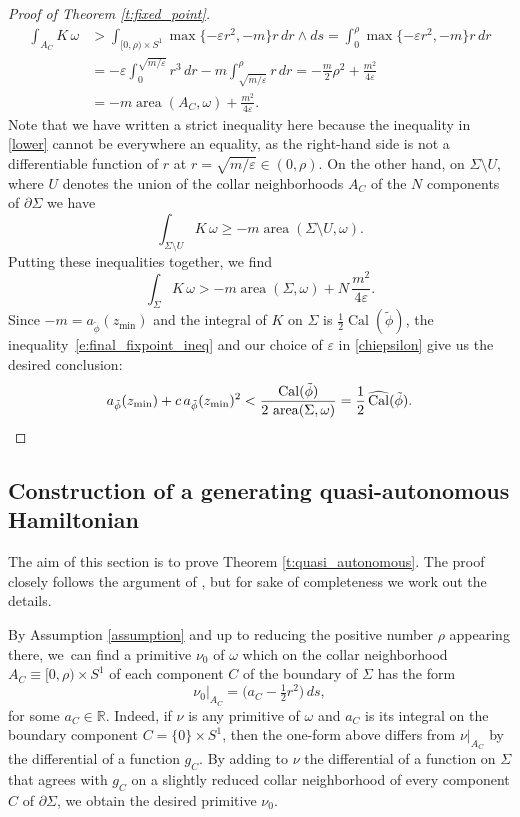 \documentclass[11pt]{article}
\newcommand{\Subsection}{\subsection}
\numberwithin{equation}{section}
\let\mathds\mathbb
\let\epsilon\varepsilon
\theoremstyle{definition}
\DeclareMathOperator{\area}{area}
\DeclareMathOperator{\Cal}{Cal}
\newcommand{\R}{\mathds{R}}
\begin{document}
\begin{proof}[Proof of Theorem \ref{t:fixed_point}]
\[
\begin{split}
\int_{A_C} K\, \omega
&>
\int_{[0,\rho) \times S^1} \max\{ -\epsilon r^2 , -m\} r\, dr\wedge ds
= \int_0^{\rho} \max\{ -\epsilon r^2 , -m\} r\, dr \\
&= - \epsilon \int_0^{\sqrt{m/\epsilon}}r^3\, dr - m \int_{\sqrt{m/\epsilon}}^{\rho} r\, dr = -\frac{m}{2} \rho^2 + \frac{m^2}{4\epsilon}\\
&
=
-m\area(A_C,\omega) + \frac{m^2}{4\epsilon}.
\end{split}
\]
Note that we have written a strict inequality here because the inequality in \eqref{lower} cannot be everywhere an equality, as the right-hand side is not a differentiable function of $r$ at $r=\sqrt{m/\epsilon} \in (0,\rho)$. On the other hand, on $\Sigma\setminus U$, where $U$ denotes the union of the collar neighborhoods $A_C$ of the $N$ components of $\partial \Sigma$ we have
\[
\int_{\Sigma\setminus U} K\, \omega \geq -m \area(\Sigma\setminus U,\omega).
\]
Putting these inequalities together, we find
\begin{equation}
\label{e:final_fixpoint_ineq}
\int_{\Sigma} K\, \omega > -m\area(\Sigma,\omega) + N \,\frac{m^2}{4\epsilon}.
\end{equation}
Since $-m=a_{\tilde{\phi}}(z_{\min})$ and the integral of $K$ on $\Sigma$ is $\tfrac12\Cal(\tilde{\phi})$, the inequality~\eqref{e:final_fixpoint_ineq} and our choice of $\epsilon$ in \eqref{chiepsilon} give us the desired conclusion:
\[
a_{\tilde{\phi}}(z_{\min}) + c\, a_{\tilde{\phi}}(z_{\min})^2
< \frac{\Cal(\tilde{\phi})}{ 2\, \area(\Sigma,\omega)} = \frac{1}{2} \, \widehat{\Cal}(\tilde{\phi}).
\qedhere
\]
\end{proof}

\Subsection{Construction of a generating quasi-autonomous Hamiltonian}\label{ss:quasi_autonomous}

The aim of this section is to prove Theorem \ref{t:quasi_autonomous}. The proof closely follows the argument of \cite[\S 4]{Benedetti:2021aa}, but for sake of completeness we work out the details.

By Assumption \ref{assumption} and up to reducing the positive number $\rho$ appearing there, we~can find a primitive $\nu_0$ of $\omega$ which on the collar neighborhood $A_C\equiv [0,\rho)\times S^1$ of each component $C$ of the boundary of $\Sigma$ has the form
\begin{equation}
\label{e:lambda|_A}
\nu_0|_{A_C} = \bigl( a_C - \tfrac{1}{2} r^2 \bigr)\, ds,
\end{equation}
for some $a_C\in \R$. Indeed, if $\nu$ is any primitive of $\omega$ and $a_C$ is its integral on the boundary component $C = \{0\} \times S^1$, then the one-form above differs from $\nu|_{A_C}$ by the differential of a function $g_C$. By adding to $\nu$ the differential of a function on $\Sigma$ that agrees with $g_C$ on a slightly reduced collar neighborhood of every component $C$ of $\partial \Sigma$, we obtain the desired primitive $\nu_0$.
\end{document}
